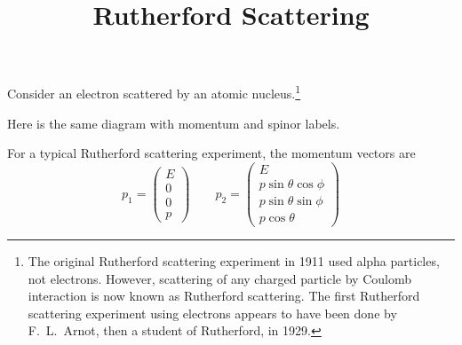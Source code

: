 \documentclass[12pt]{article}
\title{Rutherford Scattering}
\date{}
\begin{document}
\maketitle

\noindent
Consider an electron scattered by an atomic nucleus.\footnote{
The original Rutherford scattering experiment in 1911 used alpha particles, not electrons.
However, scattering of any charged particle by Coulomb interaction
is now known as Rutherford scattering.
The first Rutherford scattering experiment using electrons appears to have
been done by F.~L.~Arnot, then a student of Rutherford, in 1929.}
\begin{center}
\end{center}

\noindent
Here is the same diagram with momentum and spinor labels.
\begin{center}
\end{center}

\noindent
For a typical Rutherford scattering experiment, the momentum vectors are
\begin{equation*}
p_1=\begin{pmatrix}E\\0\\0\\p\end{pmatrix}\qquad
p_2=\begin{pmatrix}
E\\
p\sin\theta\cos\phi\\
p\sin\theta\sin\phi\\
p\cos\theta
\end{pmatrix}
\end{equation*}
\end{document}
